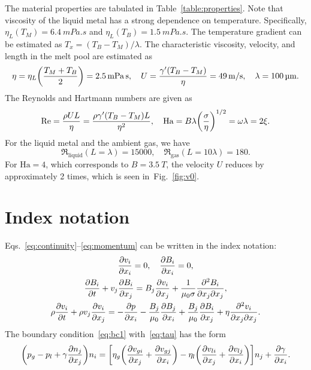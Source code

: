 \documentclass{article}
\newcommand{\Ha}{\mathrm{Ha}}
\begin{document}
The material properties are tabulated in Table~\ref{table:properties}.
Note that viscosity of the liquid metal has a strong dependence on temperature.
Specifically, $\eta_L(T_M) = \SI{6.4}{mPa.s}$ and $\eta_L(T_B) = \SI{1.5}{mPa.s}$.
The temperature gradient can be estimated as $T_x=(T_B-T_M)/\lambda$.
The characteristic viscosity, velocity, and length in the melt pool are estimated as
\begin{equation}
    \eta = \eta_L\qty(\frac{T_M+T_B}{2}) = \SI{2.5}{mPa.s}, \quad
    U = \frac{\gamma'(T_B - T_M)}{\eta} = \SI{49}{m/s}, \quad
    \lambda = \SI{100}{\um}.
\end{equation}
The Reynolds and Hartmann numbers are given as
\begin{equation}
    \Re = \frac{\rho U L}{\eta} = \frac{\rho \gamma'(T_B - T_M) L}{\eta^2}, \quad
    \Ha = B\lambda\qty(\frac{\sigma}{\eta})^{1/2} = \omega\lambda = 2\xi.
\end{equation}
For the liquid metal and the ambient gas, we have
\begin{equation}
    \Re_\text{liquid}(L=\lambda) = 15000, \quad
    \Re_\text{gas}(L=10\lambda) = 180.
\end{equation}
For $\Ha = 4$, which corresponds to $B = \SI{3.5}{T}$,
the velocity $U$ reduces by approximately 2 times, which is seen in~Fig.~\ref{fig:v0}.

\appendix

\section{Index notation}

Eqs.~\eqref{eq:continuity}--\eqref{eq:momentum} can be written in the index notation:
\begin{gather}
    \pdv{v_i}{x_i} = 0, \quad \pdv{B_i}{x_i} = 0, \label{eq:continuityI}\\
    \pdv{B_i}{t} + v_j\pdv{B_i}{x_j} = B_j\pdv{v_i}{x_j} + \frac1{\mu_0\sigma} \pdv[2]{B_i}{x_j}{x_j}, \label{eq:BI}\\
    \rho\pdv{v_i}{t} + \rho v_j\pdv{v_i}{x_j}
    = -\pdv{p}{x_i} - \frac{B_j}{\mu_0}\pdv{B_j}{x_i} + \frac{B_j}{\mu_0}\pdv{B_i}{x_j} + \eta\pdv[2]{v_i}{x_j}{x_j}. \label{eq:momentumI}
\end{gather}
The boundary condition~\eqref{eq:bc1} with~\eqref{eq:tau} has the form
\begin{equation}\label{eq:bc1I}
    \qty(p_g - p_l + \gamma\pdv{n_j}{x_j})n_i
    = \qty[
        \eta_g\qty( \pdv{v_{gi}}{x_j} + \pdv{v_{gj}}{x_i} )
      - \eta_l\qty( \pdv{v_{li}}{x_j} + \pdv{v_{lj}}{x_i} )
    ]n_j + \pdv{\gamma}{x_i}.
\end{equation}

\printbibliography
\end{document}
